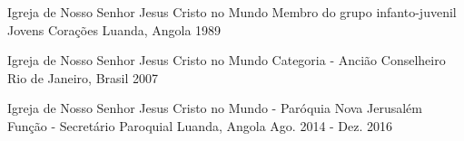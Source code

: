


\begin{cventries}

\cventry
{Igreja de Nosso Senhor Jesus Cristo no Mundo} %
{Membro do grupo infanto-juvenil Jovens Corações} %
{Luanda, Angola} %
{1989} %
{ %
}

\cventry
{Igreja de Nosso Senhor Jesus Cristo no Mundo} %
{Categoria - Ancião Conselheiro} %
{Rio de Janeiro, Brasil} %
{2007} %
{ %
}

\cventry
{Igreja de Nosso Senhor Jesus Cristo no Mundo - Paróquia Nova Jerusalém} %
{Função - Secretário Paroquial} %
{Luanda, Angola} %
{Ago. 2014 - Dez. 2016} %
{ %
}


\end{cventries}

